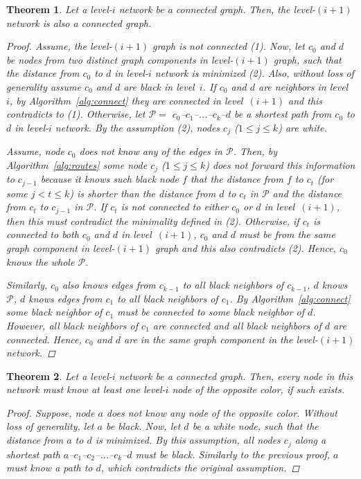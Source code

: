 \documentclass[conference]{IEEEtran}
\newtheorem{thm}{Theorem}
\theoremstyle{definition}
\newcommand{\cP}{{\mathcal{P}}}
\begin{document}
\begin{thm}
    Let a level-$i$ network be a connected graph. Then, the level-$(i+1)$ network is also a connected graph.

    \begin{proof}
        Assume, the level-$(i+1)$ graph is not connected (1). Now, let $c_0$ and $d$ be nodes from two distinct graph components in level-$(i+1)$ graph, such that the distance from $c_0$ to $d$ in level-$i$ network is minimized (2). Also, without loss of generality assume $c_0$ and $d$ are black in level~$i$. If $c_0$ and $d$ are neighbors in level~$i$, by Algorithm~\ref{alg:connect} they are connected in level~$(i+1)$ and this contradicts to (1). Otherwise, let $\cP = $ $c_0$--$c_1$--...--$c_k$--$d$ be a shortest path from $c_0$ to $d$ in level-$i$ network. By the assumption (2), nodes $c_j$ ($1 \le j \le k$) are white.

        Assume, node $c_0$ does not know any of the edges in $\cP$. Then, by Algorithm~\ref{alg:routes} some node $c_j$ ($1 \le j \le k$) does not forward this information to $c_{j-1}$ because it knows such black node $f$ that the distance from $f$ to $c_t$ (for some $j < t \le k$) is shorter than the distance from $d$ to $c_t$ in $\cP$ and the distance from $c_t$ to $c_{j-1}$ in $\cP$. If $c_t$ is not connected to either $c_0$ or $d$ in level~$(i+1)$, then this must contradict the minimality defined in (2). Otherwise, if $c_t$ is connected to both $c_0$ and $d$ in level~$(i+1)$, $c_0$ and $d$ must be from the same graph component in level-$(i+1)$ graph and this also contradicts (2). Hence, $c_0$ knows the whole $\cP$. 
        
        Similarly, $c_0$ also knows edges from $c_{k-1}$ to all black neighbors of $c_{k-1}$, $d$ knows $\cP$, $d$ knows edges from $c_1$ to all black neighbors of $c_1$. By Algorithm~\ref{alg:connect} some black neighbor of $c_1$ must be connected to some black neighbor of $d$. However, all black neighbors of $c_1$ are connected and all black neighbors of $d$ are connected. Hence, $c_0$ and $d$ are in the same graph component in the level-$(i+1)$ network.
    \end{proof}

    \label{thm:connectivity-levels}
\end{thm}

\begin{thm}
    Let a level-$i$ network be a connected graph. Then, every node in this network must know at least one level-$i$ node of the opposite color, if such exists.

    \begin{proof}
        Suppose, node $a$ does not know any node of the opposite color. Without loss of generality, let $a$ be black. Now, let $d$ be a white node, such that the distance from $a$ to $d$ is minimized. By this assumption, all nodes $c_j$ along a shortest path $a$--$c_1$--$c_2$--...--$c_k$--$d$ must be black. Similarly to the previous proof, $a$ must know a path to $d$, which contradicts the original assumption.
    \end{proof}

    \label{thm:connectivity-colors}
\end{thm}
\end{document}

